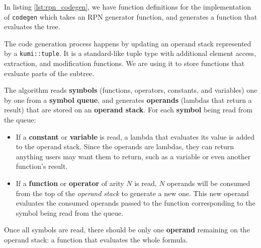 \documentclass[../main]{subfiles}
\begin{document}
In listing \ref{lst:rpn_codegen}, we have function definitions for the
implementation of \lstinline{codegen} which takes an RPN generator function,
and generates a function that evaluates the tree.

The code generation process happens by updating an operand stack represented
by a \lstinline{kumi::tuple}. It is a standard-like tuple type with additional
element access, extraction, and modification functions.
We are using it to store functions that evaluate parts of the subtree.

The algorithm reads \textbf{symbols} (\ie functions, operators, constants, and
variables) one by one from a \textbf{symbol queue}, and generates
\textbf{operands} (\ie \cpp lambdas that return a result) that are stored on an
\textbf{operand stack}. For each \textbf{symbol} being read from the queue:

\begin{itemize}
\item If a \textbf{constant} or \textbf{variable} is read, a lambda that
evaluates its value is added to the operand stack.
Since the operands are \cpp lambdas, they can return
anything users may want them to return, such as a \cpp variable
or even another function's result.

\item If a \textbf{function} or \textbf{operator} of arity $N$ is read,
$N$ operands will be consumed from the top of the \textit{operand stack}
to generate a new one. This new operand evaluates the consumed operands passed
to the function corresponding to the symbol being read from the queue.
\end{itemize}

Once all symbols are read, there should be only one \textbf{operand} remaining
on the operand stack: a function that evaluates the whole formula.
\end{document}
